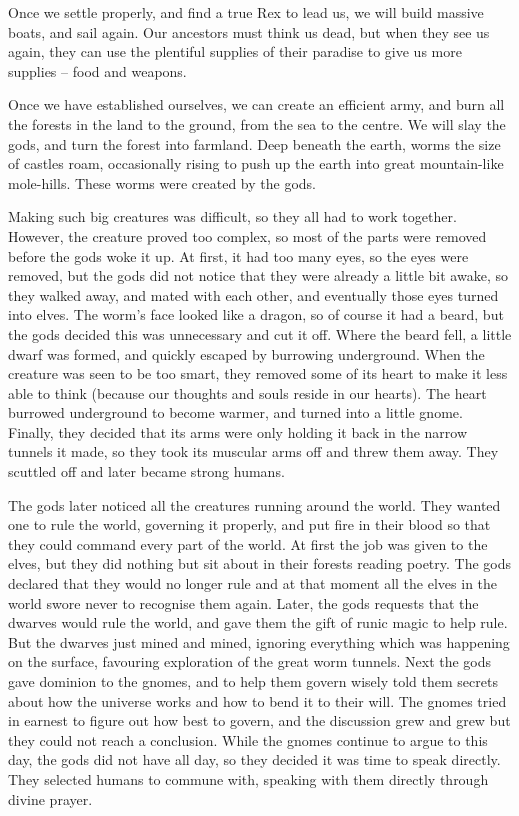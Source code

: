\begin{multicols}{2}
\begin{exampletext}
  Once we settle properly, and find a true Rex to lead us, we will build massive boats, and sail again.
  Our ancestors must think us dead, but when they see us again, they can use the plentiful supplies of their paradise to give us more supplies -- food and weapons.

  Once we have established ourselves, we can create an efficient army, and burn all the forests in the land to the ground, from the sea to the centre.
  We will slay the gods, and turn the forest into farmland.
\else
  \noindent
  Deep beneath the earth, worms the size of castles roam, occasionally rising to push up the earth into great mountain-like mole-hills.
  These worms were created by the gods.

  Making such big creatures was difficult, so they all had to work together.
  However, the creature proved too complex, so most of the parts were removed before the gods woke it up.
  At first, it had too many eyes, so the eyes were removed, but the gods did not notice that they were already a little bit awake, so they walked away, and mated with each other, and eventually those eyes turned into elves.
  The worm's face looked like a dragon, so of course it had a beard, but the gods decided this was unnecessary and cut it off.
  Where the beard fell, a little dwarf was formed, and quickly escaped by burrowing underground.
  When the creature was seen to be too smart, they removed some of its heart to make it less able to think (because our thoughts and souls reside in our hearts).
  The heart burrowed underground to become warmer, and turned into a little gnome.
  Finally, they decided that its arms were only holding it back in the narrow tunnels it made, so they took its muscular arms off and threw them away.
  They scuttled off and later became strong humans.

  The gods later noticed all the creatures running around the world.
  They wanted one to rule the world, governing it properly, and put fire in their blood so that they could command every part of the world.
  At first the job was given to the elves, but they did nothing but sit about in their forests reading poetry.
  The gods declared that they would no longer rule and at that moment all the elves in the world swore never to recognise them again.
  Later, the gods requests that the dwarves would rule the world, and gave them the gift of runic magic to help rule.
  But the dwarves just mined and mined, ignoring everything which was happening on the surface, favouring exploration of the great worm tunnels.
  Next the gods gave dominion to the gnomes, and to help them govern wisely told them secrets about how the universe works and how to bend it to their will.
  The gnomes tried in earnest to figure out how best to govern, and the discussion grew and grew but they could not reach a conclusion.
  While the gnomes continue to argue to this day, the gods did not have all day, so they decided it was time to speak directly.
  They selected humans to commune with, speaking with them directly through divine prayer.


\end{exampletext}
\end{multicols}
